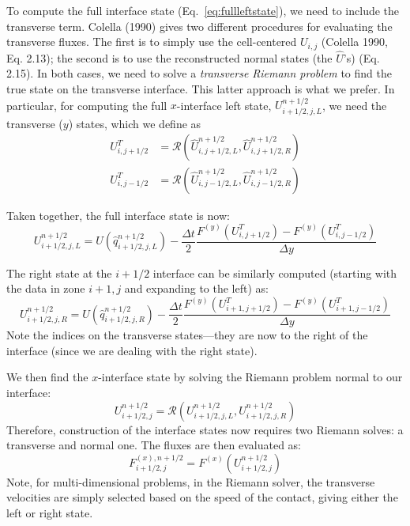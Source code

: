 To compute the full interface state (Eq.~\ref{eq:fullleftstate}), we
need to include the transverse term.
Colella (1990) gives two different procedures for evaluating the
transverse fluxes.  The first is to simply use the cell-centered
$U_{i,j}$ (Colella 1990,
Eq. 2.13); the second is to use the reconstructed normal states (the
$\hat{U}$'s) (Eq. 2.15).  In both cases, we need to solve a {\em
  transverse Riemann problem} to find the true state on the transverse
interface.  This latter approach is what we prefer.  In particular,
for computing the full $x$-interface left state, $U_{i+1/2,j,L}^{n+1/2}$, we need the
transverse ($y$) states, which we define as
\begin{align}
U^T_{i,j+1/2} &= \mathcal{R}(\hat{U}^{n+1/2}_{i,j+1/2,L},
                            \hat{U}^{n+1/2}_{i,j+1/2,R}) \\
U^T_{i,j-1/2} &= \mathcal{R}(\hat{U}^{n+1/2}_{i,j-1/2,L},
                            \hat{U}^{n+1/2}_{i,j-1/2,R})
\end{align}

Taken together, the full interface state is now:
\begin{equation}
U_{i+1/2,j,L}^{n+1/2} = U(\hat{q}_{i+1/2,j,L}^{n+1/2})
   - \frac{\Delta t}{2} \frac{F^{(y)}(U^T_{i,j+1/2}) - F^{(y)}(U^T_{i,j-1/2})}{\Delta y}
\end{equation}

The right state at the $i+1/2$ interface can be similarly computed (starting with the
data in zone $i+1,j$ and expanding to the left) as:
\begin{equation}
U_{i+1/2,j,R}^{n+1/2} = U(\hat{q}_{i+1/2,j,R}^{n+1/2})
   - \frac{\Delta t}{2} \frac{F^{(y)}(U^T_{i+1,j+1/2}) - F^{(y)}(U^T_{i+1,j-1/2})}{\Delta y}
\end{equation}
Note the indices on the transverse states---they are now to the right of the interface (since
we are dealing with the right state).

We then find the $x$-interface state by solving the Riemann problem
normal to our interface:
\begin{equation}
U_{i+1/2,j}^{n+1/2} = \mathcal{R}(U_{i+1/2,j,L}^{n+1/2}, U_{i+1/2,j,R}^{n+1/2})
\end{equation}
Therefore, construction of the interface states now requires two
Riemann solves: a transverse and normal one.  The fluxes are then evaluated as:
\begin{equation}
F^{(x),n+1/2}_{i+1/2,j} = F^{(x)}(U_{i+1/2,j}^{n+1/2})
\end{equation}
Note, for multi-dimensional problems, in the Riemann solver, the transverse
velocities are simply selected based on the speed of the contact, giving
either the left or right state.

